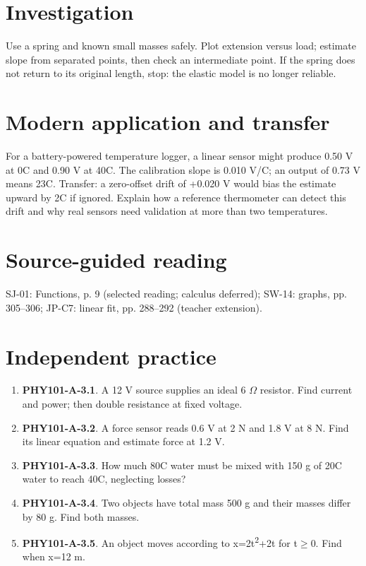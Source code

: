 \documentclass[11pt,a4paper,openany]{book}
\begin{document}
\section{Investigation}
Use a spring and known small masses safely. Plot extension versus load; estimate slope from separated points, then check an intermediate point. If the spring does not return to its original length, stop: the elastic model is no longer reliable.
\section{Modern application and transfer}
For a battery-powered temperature logger, a linear sensor might produce 0.50 V at 0\textdegree{}C and 0.90 V at 40\textdegree{}C. The calibration slope is 0.010 V/\textdegree{}C; an output of 0.73 V means 23\textdegree{}C. Transfer: a zero-offset drift of +0.020 V would bias the estimate upward by 2\textdegree{}C if ignored. Explain how a reference thermometer can detect this drift and why real sensors need validation at more than two temperatures.
\section{Source-guided reading}
SJ-01: Functions, p. 9 (selected reading; calculus deferred); SW-14: graphs, pp. 305–306; JP-C7: linear fit, pp. 288–292 (teacher extension).
\section{Independent practice}
\begin{enumerate}
\item \textbf{PHY101-A-3.1}. A 12 V source supplies an ideal 6 \ensuremath{\Omega} resistor. Find current and power; then double resistance at fixed voltage.
\item \textbf{PHY101-A-3.2}. A force sensor reads 0.6 V at 2 N and 1.8 V at 8 N. Find its linear equation and estimate force at 1.2 V.
\item \textbf{PHY101-A-3.3}. How much 80\textdegree{}C water must be mixed with 150 g of 20\textdegree{}C water to reach 40\textdegree{}C, neglecting losses?
\item \textbf{PHY101-A-3.4}. Two objects have total mass 500 g and their masses differ by 80 g. Find both masses.
\item \textbf{PHY101-A-3.5}. An object moves according to x=2t\textsuperscript{2}+2t for t\ensuremath{\ge}0. Find when x=12 m.
\end{enumerate}
\end{document}
